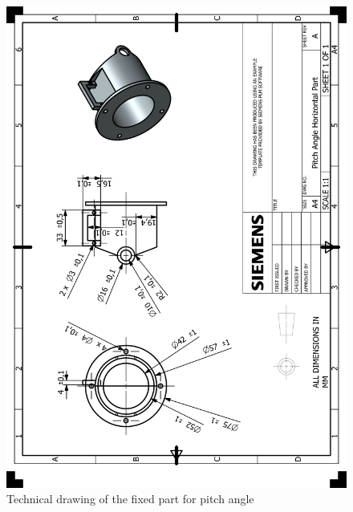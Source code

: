 \documentclass[12pt]{report}
\begin{document}
\begin{appendices}
\begin{figure}[H]
    \centering
    \includegraphics[width=\textwidth]{HP_Pitch Angle Horizontal Part.png} 
    \caption{Technical drawing of the fixed part for pitch angle}
    \label{fig:technical-drawing}
\end{figure}


\end{appendices}
\end{document}
